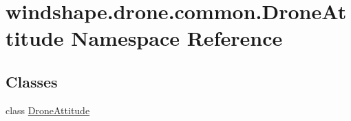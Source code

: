 \hypertarget{namespacewindshape_1_1drone_1_1common_1_1_drone_attitude}{}\section{windshape.\+drone.\+common.\+Drone\+Attitude Namespace Reference}
\label{namespacewindshape_1_1drone_1_1common_1_1_drone_attitude}
\subsection*{Classes}
\begin{DoxyCompactItemize}
\item 
class \mbox{\hyperlink{classwindshape_1_1drone_1_1common_1_1_drone_attitude_1_1_drone_attitude}{Drone\+Attitude}}
\end{DoxyCompactItemize}
